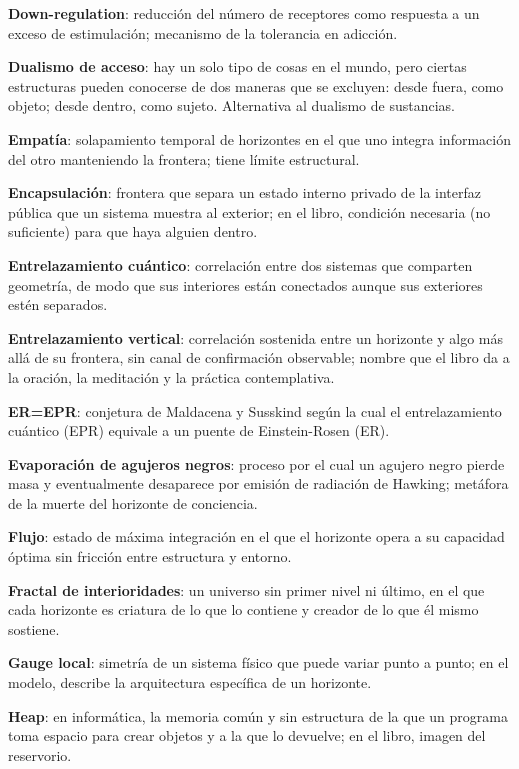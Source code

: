 \glos \textbf{Down-regulation}: reducción del número de receptores como respuesta a un exceso de estimulación; mecanismo de la tolerancia en adicción.

\glos \textbf{Dualismo de acceso}: hay un solo tipo de cosas en el mundo, pero ciertas estructuras pueden conocerse de dos maneras que se excluyen: desde fuera, como objeto; desde dentro, como sujeto. Alternativa al dualismo de sustancias.

\glos \textbf{Empatía}: solapamiento temporal de horizontes en el que uno integra información del otro manteniendo la frontera; tiene límite estructural.

\glos \textbf{Encapsulación}: frontera que separa un estado interno privado de la interfaz pública que un sistema muestra al exterior; en el libro, condición necesaria (no suficiente) para que haya alguien dentro.

\glos \textbf{Entrelazamiento cuántico}: correlación entre dos sistemas que comparten geometría, de modo que sus interiores están conectados aunque sus exteriores estén separados.

\glos \textbf{Entrelazamiento vertical}: correlación sostenida entre un horizonte y algo más allá de su frontera, sin canal de confirmación observable; nombre que el libro da a la oración, la meditación y la práctica contemplativa.

\glos \textbf{ER=EPR}: conjetura de Maldacena y Susskind según la cual el entrelazamiento cuántico (EPR) equivale a un puente de Einstein-Rosen (ER).

\glos \textbf{Evaporación de agujeros negros}: proceso por el cual un agujero negro pierde masa y eventualmente desaparece por emisión de radiación de Hawking; metáfora de la muerte del horizonte de conciencia.

\glos \textbf{Flujo}: estado de máxima integración en el que el horizonte opera a su capacidad óptima sin fricción entre estructura y entorno.

\glos \textbf{Fractal de interioridades}: un universo sin primer nivel ni último, en el que cada horizonte es criatura de lo que lo contiene y creador de lo que él mismo sostiene.

\glos \textbf{Gauge local}: simetría de un sistema físico que puede variar punto a punto; en el modelo, describe la arquitectura específica de un horizonte.

\glos \textbf{Heap}: en informática, la memoria común y sin estructura de la que un programa toma espacio para crear objetos y a la que lo devuelve; en el libro, imagen del reservorio.

